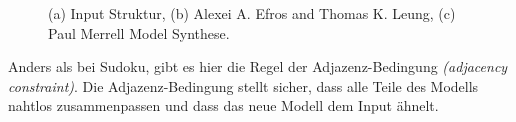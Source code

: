 \documentclass[12pt, a4paper,twoside,openright]{report}
\begin{document}
\begin{figure}[H]
    \centering
    \qquad
    \qquad
    \caption{(a) Input Struktur, (b) Alexei A. Efros and Thomas K. Leung, (c) Paul Merrell Model Synthese. \cite{merrell2009model}}%
\end{figure}

Anders als bei Sudoku, gibt es hier die Regel der Adjazenz-Bedingung \textit{(adjacency constraint)}.
Die Adjazenz-Bedingung stellt sicher, dass alle Teile des Modells nahtlos zusammenpassen und dass das neue Modell dem Input ähnelt.
\end{document}
